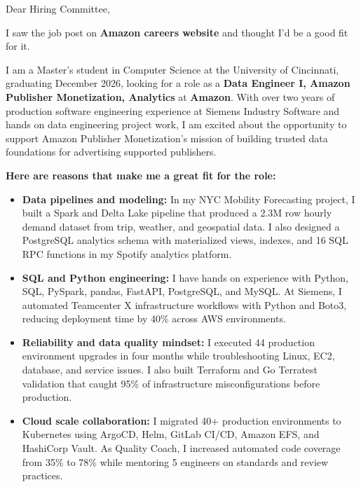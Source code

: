 \documentclass[11pt]{letter}
\date{}
\begin{document}
\begin{letter}{}

\opening{Dear Hiring Committee,}

I saw the job post on \textbf{Amazon careers website} and thought I'd be a good fit for it.

I am a Master's student in Computer Science at the University of Cincinnati, graduating December 2026, looking for a role as a \textbf{Data Engineer I, Amazon Publisher Monetization, Analytics} at \textbf{Amazon}. With over two years of production software engineering experience at Siemens Industry Software and hands on data engineering project work, I am excited about the opportunity to support Amazon Publisher Monetization's mission of building trusted data foundations for advertising supported publishers.

\textbf{Here are reasons that make me a great fit for the role:}

\begin{itemize}[leftmargin=*, itemsep=0.35em]
    \item \textbf{Data pipelines and modeling:} In my NYC Mobility Forecasting project, I built a Spark and Delta Lake pipeline that produced a 2.3M row hourly demand dataset from trip, weather, and geospatial data. I also designed a PostgreSQL analytics schema with materialized views, indexes, and 16 SQL RPC functions in my Spotify analytics platform.

    \item \textbf{SQL and Python engineering:} I have hands on experience with Python, SQL, PySpark, pandas, FastAPI, PostgreSQL, and MySQL. At Siemens, I automated Teamcenter X infrastructure workflows with Python and Boto3, reducing deployment time by 40\% across AWS environments.

    \item \textbf{Reliability and data quality mindset:} I executed 44 production environment upgrades in four months while troubleshooting Linux, EC2, database, and service issues. I also built Terraform and Go Terratest validation that caught 95\% of infrastructure misconfigurations before production.

    \item \textbf{Cloud scale collaboration:} I migrated 40+ production environments to Kubernetes using ArgoCD, Helm, GitLab CI/CD, Amazon EFS, and HashiCorp Vault. As Quality Coach, I increased automated code coverage from 35\% to 78\% while mentoring 5 engineers on standards and review practices.
\end{itemize}


\end{letter}
\end{document}
